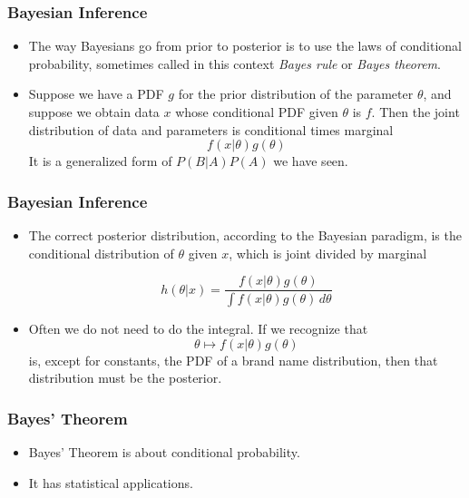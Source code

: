 \documentclass[12pt]{beamer}
\begin{document}
\begin{frame}
	\frametitle{Bayesian Inference}
	
	\begin{itemize}[label={\color{blue}$\blacktriangleright$}]
		\item The way Bayesians go from prior to posterior is to use the laws of conditional probability, sometimes called in this context \textit{Bayes rule} or \textit{Bayes theorem}.
		
		\item Suppose we have a PDF $g$ for the prior distribution of the parameter $\theta$, and suppose we obtain data $x$ whose conditional PDF given $\theta$ is $f$. Then the joint distribution of data and parameters is conditional times marginal
		\[ f(x|\theta)g(\theta) \]
		It is a generalized form of $P(B|A)P(A)$ we have seen.

	\end{itemize}
	
\end{frame}
\begin{frame}
	\frametitle{Bayesian Inference}
	
	\begin{itemize}[label={\color{blue}$\blacktriangleright$}]
		\item The correct posterior distribution, according to the Bayesian paradigm, is the conditional distribution of $\theta$ given $x$, which is joint divided by marginal
		
		\[ h(\theta|x) = \frac{f(x|\theta)g(\theta)}{\int f(x|\theta)g(\theta)\,d\theta} \]
		
		\item Often we do not need to do the integral. If we recognize that
		\[ \theta \mapsto f(x|\theta)g(\theta) \]
		is, except for constants, the PDF of a brand name distribution, then that distribution must be the posterior.
	\end{itemize}
	
\end{frame}
\begin{frame}
	\frametitle{Bayes' Theorem}
	
	\begin{itemize}[label={\color{blue}$\blacktriangleright$}]
		\item Bayes' Theorem is about conditional probability.
		
		\item It has statistical applications.
	\end{itemize}
	
\end{frame}
\end{document}
